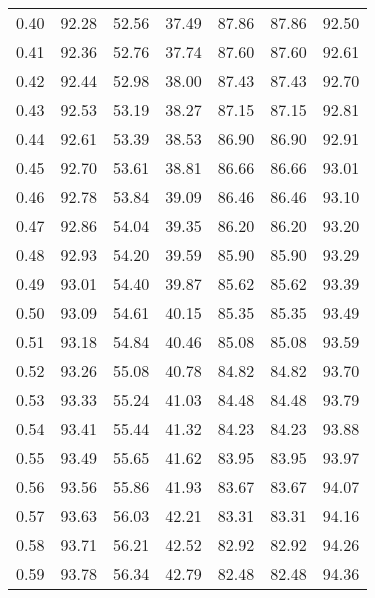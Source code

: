 \begin{tabular}{|c|c|c|c|c|c|c|}
      0.40 &     92.28 &     52.56 &      37.49 &   87.86 &      87.86 &         92.50 \\
      0.41 &     92.36 &     52.76 &      37.74 &   87.60 &      87.60 &         92.61 \\
      0.42 &     92.44 &     52.98 &      38.00 &   87.43 &      87.43 &         92.70 \\
      0.43 &     92.53 &     53.19 &      38.27 &   87.15 &      87.15 &         92.81 \\
      0.44 &     92.61 &     53.39 &      38.53 &   86.90 &      86.90 &         92.91 \\
      0.45 &     92.70 &     53.61 &      38.81 &   86.66 &      86.66 &         93.01 \\
      0.46 &     92.78 &     53.84 &      39.09 &   86.46 &      86.46 &         93.10 \\
      0.47 &     92.86 &     54.04 &      39.35 &   86.20 &      86.20 &         93.20 \\
      0.48 &     92.93 &     54.20 &      39.59 &   85.90 &      85.90 &         93.29 \\
      0.49 &     93.01 &     54.40 &      39.87 &   85.62 &      85.62 &         93.39 \\
      0.50 &     93.09 &     54.61 &      40.15 &   85.35 &      85.35 &         93.49 \\
      0.51 &     93.18 &     54.84 &      40.46 &   85.08 &      85.08 &         93.59 \\
      0.52 &     93.26 &     55.08 &      40.78 &   84.82 &      84.82 &         93.70 \\
      0.53 &     93.33 &     55.24 &      41.03 &   84.48 &      84.48 &         93.79 \\
      0.54 &     93.41 &     55.44 &      41.32 &   84.23 &      84.23 &         93.88 \\
      0.55 &     93.49 &     55.65 &      41.62 &   83.95 &      83.95 &         93.97 \\
      0.56 &     93.56 &     55.86 &      41.93 &   83.67 &      83.67 &         94.07 \\
      0.57 &     93.63 &     56.03 &      42.21 &   83.31 &      83.31 &         94.16 \\
      0.58 &     93.71 &     56.21 &      42.52 &   82.92 &      82.92 &         94.26 \\
      0.59 &     93.78 &     56.34 &      42.79 &   82.48 &      82.48 &         94.36 \\

\end{tabular}
